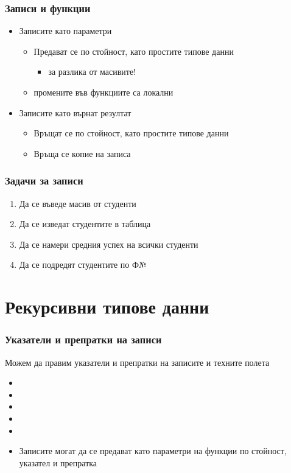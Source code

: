 \documentclass[alsotrans]{beamerswitch}
\begin{document}
\begin{frame}
  \frametitle{Записи и функции}

  \begin{itemize}[<+->]
  \item Записите като параметри
    \begin{itemize}
    \item Предават се \alert{по стойност}, като простите типове данни
      \begin{itemize}
      \item за разлика от масивите!
      \end{itemize}
    \item промените във функциите са локални
    \end{itemize}
  \item Записите като върнат резултат
    \begin{itemize}
    \item Връщат се \alert{по стойност}, като простите типове данни
    \item Връща се копие на записа
    \end{itemize}
  \end{itemize}
\end{frame}

\begin{frame}
  \frametitle{Задачи за записи}

  \begin{enumerate}[<+->]
  \item Да се въведе масив от студенти
  \item Да се изведат студентите в таблица
  \item Да се намери средния успех на всички студенти
  \item Да се подредят студентите по Ф№
  \end{enumerate}
\end{frame}

\section{Рекурсивни типове данни}

\begin{frame}
  \frametitle{Указатели и препратки на записи}

  Можем да правим указатели и препратки на записите и техните полета

  \begin{itemize}[<+->]
  \item {}
  \item {}
  \item {}
  \item {}
  \item {}
  \item Записите могат да се предават като параметри на функции по стойност, указател и препратка
  \end{itemize}
\end{frame}
\end{document}
